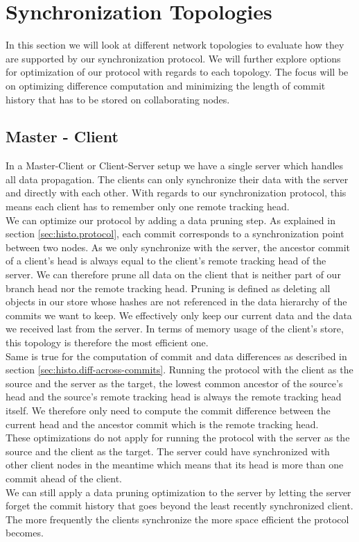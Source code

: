 
\section{Synchronization Topologies}
\label{sec:histo.topologies}

In this section we will look at different network topologies to evaluate how they are supported by our synchronization protocol.
We will further explore options for optimization of our protocol with regards to each topology.
The focus will be on optimizing difference computation and minimizing the length of commit history that has to be stored on collaborating nodes.

\subsection{Master - Client}
\label{sec:histo.topologies.master-client}
In a Master-Client or Client-Server setup we have a single server which handles all data propagation.
The clients can only synchronize their data with the server and directly with each other.
With regards to our synchronization protocol, this means each client has to remember only one remote tracking head.\\
We can optimize our protocol by adding a data pruning step.
As explained in section \ref{sec:histo.protocol}, each commit corresponds to a synchronization point between two nodes.
As we only synchronize with the server, the ancestor commit of a client's head is always equal to the client's remote tracking head of the server.
We can therefore prune all data on the client that is neither part of our branch head nor the remote tracking head.
Pruning is defined as deleting all objects in our store whose hashes are not referenced in the data hierarchy of the commits we want to keep.
We effectively only keep our current data and the data we received last from the server.
In terms of memory usage of the client's store, this topology is therefore the most efficient one.\\
Same is true for the computation of commit and data differences as described in section \ref{sec:histo.diff-across-commits}.
Running the protocol with the client as the source and the server as the target, the lowest common ancestor of the source's head and the source's remote tracking head is always the remote tracking head itself.
We therefore only need to compute the commit difference between the current head and the ancestor commit which is the remote tracking head.\\
These optimizations do not apply for running the protocol with the server as the source and the client as the target.
The server could have synchronized with other client nodes in the meantime which means that its head is more than one commit ahead of the client.\\
We can still apply a data pruning optimization to the server by letting the server forget the commit history that goes beyond the least recently synchronized client.
The more frequently the clients synchronize the more space efficient the protocol becomes.

